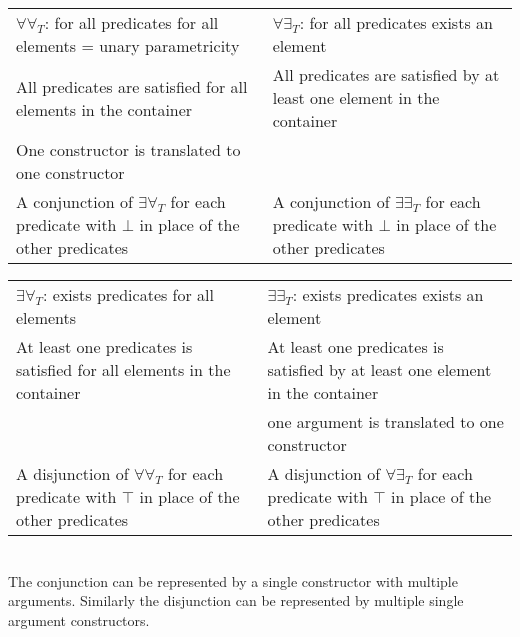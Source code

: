 \begin{tabularx}{\textwidth}{ m|m }
$\forall\forall_T$: for all predicates for all elements = unary parametricity &
$\forall\exists_T$: for all predicates exists an element \\
All predicates are satisfied for all elements in the container &
All predicates are satisfied by at least one element in the container \\
One constructor is translated to one constructor &
\\
A conjunction of $\exists\forall_T$ for each predicate with $\bot$ in place of the other predicates &
A conjunction of $\exists\exists_T$ for each predicate with $\bot$ in place of the other predicates
\end{tabularx}

\noindent\makebox[\linewidth]{\rule{\textwidth}{0.4pt}}
\begin{tabularx}{\textwidth}{ m|m }
$\exists\forall_T$: exists predicates for all elements &
$\exists\exists_T$: exists predicates exists an element \\
At least one predicates is satisfied for all elements in the container &
At least one predicates is satisfied by at least one element in the container \\
&
one argument is translated to one constructor\\
A disjunction of $\forall\forall_T$ for each predicate with $\top$ in place of the other predicates &
A disjunction of $\forall\exists_T$ for each predicate with $\top$ in place of the other predicates
\end{tabularx}
\ \\
The conjunction can be represented by a single constructor with multiple arguments.
Similarly the disjunction can be represented by multiple single argument constructors.